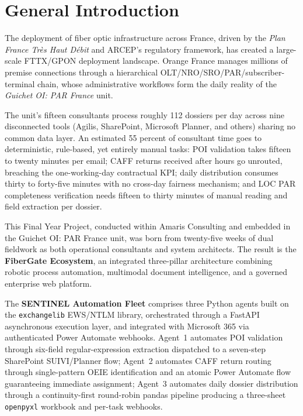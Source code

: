 \chapter*{General Introduction}
\thispagestyle{MyStyle}

The deployment of fiber optic infrastructure across France, driven by the \textit{Plan France Tr\`es Haut D\'ebit} and ARCEP's regulatory framework, has created a large-scale FTTX/GPON deployment landscape. Orange France manages millions of premise connections through a hierarchical OLT/NRO/SRO/PAR/subscriber-terminal chain, whose administrative workflows form the daily reality of the \textit{Guichet OI: PAR France} unit.

The unit's fifteen consultants process roughly 112 dossiers per day across nine disconnected tools (Agilis, SharePoint, Microsoft Planner, and others) sharing no common data layer. An estimated 55 percent of consultant time goes to deterministic, rule-based, yet entirely manual tasks: POI validation takes fifteen to twenty minutes per email; CAFF returns received after hours go unrouted, breaching the one-working-day contractual KPI; daily distribution consumes thirty to forty-five minutes with no cross-day fairness mechanism; and LOC PAR completeness verification needs fifteen to thirty minutes of manual reading and field extraction per dossier.

This Final Year Project, conducted within Amaris Consulting and embedded in the Guichet OI: PAR France unit, was born from twenty-five weeks of dual fieldwork as both operational consultants and system architects. The result is the \textbf{FiberGate Ecosystem}, an integrated three-pillar architecture combining robotic process automation, multimodal document intelligence, and a governed enterprise web platform.

The \textbf{SENTINEL Automation Fleet} comprises three Python agents built on the \texttt{exchangelib} EWS/NTLM library, orchestrated through a FastAPI asynchronous execution layer, and integrated with Microsoft 365 via authenticated Power Automate webhooks. Agent~1 automates POI validation through six-field regular-expression extraction dispatched to a seven-step SharePoint SUIVI/Planner flow; Agent~2 automates CAFF return routing through single-pattern OEIE identification and an atomic Power Automate flow guaranteeing immediate assignment; Agent~3 automates daily dossier distribution through a continuity-first round-robin pandas pipeline producing a three-sheet \texttt{openpyxl} workbook and per-task webhooks.

